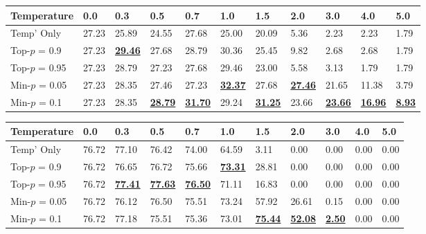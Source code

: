 \documentclass{article}
\begin{document}
\begin{table*}[ht]
\vspace{0.5em}

\begin{subtable}[t]{\textwidth}
\centering
\caption{Accuracy (\%) on GPQA Main benchmark (LLAMA 3.2 3B-Instruct)}
\vspace{-0.5em}
\begin{tabular}{lllllllllll}
\toprule
Temperature & 0.0 & 0.3 & 0.5 & 0.7 & 1.0 & 1.5 & 2.0 & 3.0 & 4.0 & 5.0 \\
\midrule
Temp' Only & 27.23 & 25.89 & 24.55 & 27.68 & 25.00 & 20.09 & 5.36 & 2.23 & 2.23 & 1.79 \\
Top-\(p\) = 0.9 & 27.23 & \textbf{\underline{29.46}} & 27.68 & 28.79 & 30.36 & 25.45 & 9.82 & 2.68 & 2.68 & 1.79 \\
Top-\(p\) = 0.95 & 27.23 & 28.79 & 27.23 & 27.68 & 29.46 & 23.00 & 5.58 & 3.13 & 1.79 & 1.79 \\
Min-\(p\) = 0.05 & 27.23 & 28.35 & 27.46 & 27.23 & \textbf{\underline{32.37}} & 27.68 & \textbf{\underline{27.46}} & 21.65 & 11.38 & 3.79 \\
Min-\(p\) = 0.1 & 27.23 & 28.35 & \textbf{\underline{28.79}} & \textbf{\underline{31.70}} & 29.24 & \textbf{\underline{31.25}} & 23.66 & \textbf{\underline{23.66}} & \textbf{\underline{16.96}} & \textbf{\underline{8.93}} \\
\bottomrule
\end{tabular}
\end{subtable}

\vspace{0.5em}

\begin{subtable}[t]{\textwidth}
\centering
\caption{Accuracy (\%) on GSM8K CoT benchmark (LLAMA 3.2 3B-Instruct)}
\vspace{-0.5em}
\begin{tabular}{lllllllllll}
\toprule
Temperature & 0.0 & 0.3 & 0.5 & 0.7 & 1.0 & 1.5 & 2.0 & 3.0 & 4.0 & 5.0 \\
\midrule
Temp' Only & 76.72 & 77.10 & 76.42 & 74.00 & 64.59 & 3.11 & 0.00 & 0.00 & 0.00 & 0.00 \\
Top-\(p\) = 0.9 & 76.72 & 76.65 & 76.72 & 75.66 & \textbf{\underline{73.31}} & 28.81 & 0.00 & 0.00 & 0.00 & 0.00 \\
Top-\(p\) = 0.95 & 76.72 & \textbf{\underline{77.41}} & \textbf{\underline{77.63}} & \textbf{\underline{76.50}} & 71.11 & 16.83 & 0.00 & 0.00 & 0.00 & 0.00 \\
Min-\(p\) = 0.05 & 76.72 & 76.12 & 76.50 & 75.51 & 73.24 & 57.92 & 26.61 & 0.15 & 0.00 & 0.00 \\
Min-\(p\) = 0.1 & 76.72 & 77.18 & 75.51 & 75.36 & 73.01 & \textbf{\underline{75.44}} & \textbf{\underline{52.08}} & \textbf{\underline{2.50}} & 0.00 & 0.00 \\
\bottomrule
\end{tabular}
\end{subtable}


\end{table*}
\end{document}
